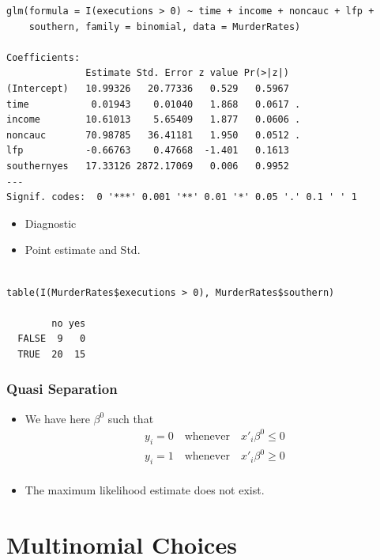 \documentclass{beamer}
\newcommand{\1}{\mathbb{1}}
\begin{document}
\begin{verbatim}
glm(formula = I(executions > 0) ~ time + income + noncauc + lfp + 
    southern, family = binomial, data = MurderRates)

Coefficients:
              Estimate Std. Error z value Pr(>|z|)  
(Intercept)   10.99326   20.77336   0.529   0.5967  
time           0.01943    0.01040   1.868   0.0617 .
income        10.61013    5.65409   1.877   0.0606 .
noncauc       70.98785   36.41181   1.950   0.0512 .
lfp           -0.66763    0.47668  -1.401   0.1613  
southernyes   17.33126 2872.17069   0.006   0.9952  
---
Signif. codes:  0 '***' 0.001 '**' 0.01 '*' 0.05 '.' 0.1 ' ' 1
\end{verbatim}

\begin{frame}
\begin{itemize}
 \item Diagnostic
 \item Point estimate and Std.
\end{itemize}

\end{frame}

\begin{verbatim}

table(I(MurderRates$executions > 0), MurderRates$southern)
       
        no yes
  FALSE  9   0
  TRUE  20  15

\end{verbatim}


\begin{frame}\frametitle{Quasi Separation}
\begin{itemize}
 \item We have here $\beta^0$ such that 
\begin{eqnarray*}
 y_i =  0 \quad \text{whenever} \quad x'_i \beta^0 
 \leq 0 \\
  y_i =  1 \quad \text{whenever} \quad x'_i \beta^0 
 \geq 0 \\
\end{eqnarray*}
\item The maximum likelihood estimate does not exist. 
\end{itemize}
\end{frame}

\section{Multinomial Choices}

\begin{frame}
\tableofcontents[currentsection] 
\end{frame}
\end{document}
